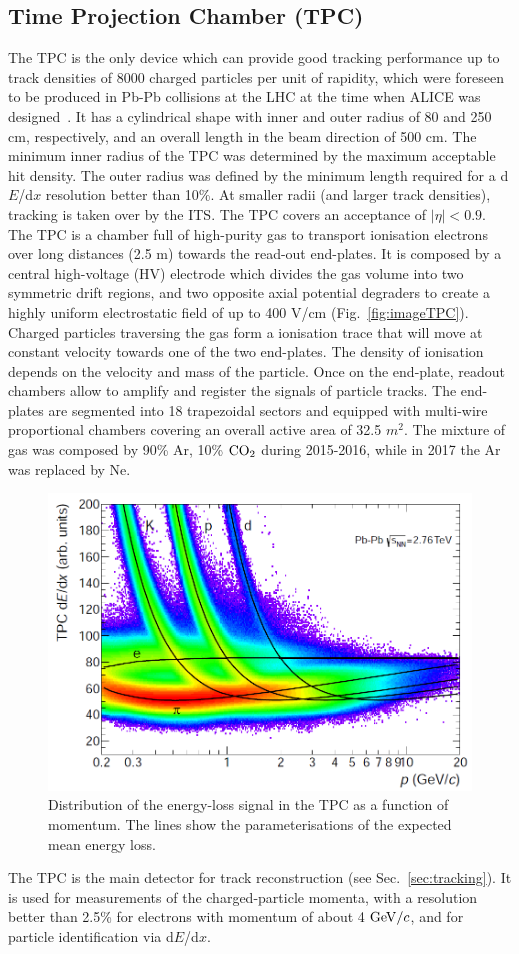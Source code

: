 \subsection{Time Projection Chamber (TPC)}
\label{sec:TPC}
The TPC is the only device which can provide good tracking
performance up to track densities of 8000 charged particles per unit of rapidity, 
which were foreseen to be produced in Pb-Pb collisions at the LHC at the time when
ALICE was designed~\cite{Dellacasa:451098}. 
It has a cylindrical shape with inner and outer radius of 80 and 250 cm, 
respectively, and an overall length in the beam direction of 500 cm. The minimum  
inner radius of the TPC was determined by the maximum acceptable hit density. 
The outer radius was defined by the minimum length required for a d$E$/d$x$ resolution 
better than 10\%. At smaller radii (and larger track densities), tracking is taken over 
by the ITS. The TPC covers an acceptance of $|\eta|<0.9$. The TPC is a chamber full of 
high-purity gas to transport ionisation electrons over long distances (2.5 m) towards the read-out end-plates. 
It is composed by a central high-voltage (HV) electrode which divides the 
gas volume into two symmetric drift regions, and two opposite axial potential degraders to
create a highly uniform electrostatic field of up to 400 V/cm (Fig.~\ref{fig:imageTPC}).
Charged particles traversing the gas form a ionisation trace that will move at constant 
velocity towards one of the two end-plates. The density of ionisation depends on the velocity and mass of the particle.
Once on the end-plate, readout chambers allow to amplify and register the signals 
of particle tracks. The end-plates are segmented into 18 trapezoidal sectors 
and equipped with multi-wire proportional chambers covering an overall active area of 32.5 $m^2$.
The mixture of gas was composed by 90\% Ar, 10\% ${\rm CO}_2$ during 2015-2016, while in 
2017 the Ar was replaced by Ne.
 \begin{figure}[!h]
\centering
\includegraphics[width=.65\textwidth]{FigCap3/TPCpid.png}
\caption{Distribution of the energy-loss signal in the TPC as a function of momentum. The lines show the parameterisations of the expected mean energy loss.}
\label{fig:imagePIDTPC}
\end{figure}
The TPC is the main detector for track reconstruction (see Sec.~\ref{sec:tracking}). 
It is used for measurements of the charged-particle 
momenta, with a resolution better than 2.5\% for electrons with momentum 
of about 4 $\mathrm{GeV}/c$, and for particle identification via d$E$/d$x$.\\


